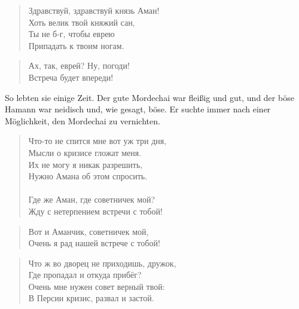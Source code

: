\documentclass[12pt,a4paper,titlepage]{article}
\begin{document}
\begin{drama}
\mspeaks {}
\begin{verse}
Здравствуй, здравствуй князь Аман!\\
Хоть велик твой княжий сан,\\
Ты не б-г, чтобы еврею\\
Припадать к твоим ногам.\\
\end{verse}


\amspeaks
\begin{verse}
Ах, так, еврей? Ну, погоди!\\
Встреча будет впереди!\\
\end{verse}


\uespeaks
So lebten sie einige Zeit. Der gute Mordechai war fleißig und gut,
und der böse Hamann war neidisch und, wie gesagt, böse. Er suchte
immer nach einer Möglichkeit, den Mordechai zu vernichten.


\scene


\ahspeaks {}
\begin{verse}
Что-то не спится мне вот уж три дня,\\
Мысли о кризисе гложат меня.\\
Их не могу я никак разрешить,\\
Нужно Амана об этом спросить.\\
\\
Где же Аман, где советничек мой?\\
Жду с нетерпением встречи с тобой!\\
\end{verse}


\ahspeaks
\begin{verse}
Вот и Аманчик, советничек мой,\\
Очень я рад нашей встрече с тобой!\\
\end{verse}


\ahspeaks {}
\begin{verse}
Что ж во дворец не приходишь, дружок,\\
Где пропадал и откуда прибёг?\\
Очень мне нужен совет верный твой:\\
В Персии кризис, развал и застой.\\
\end{verse}


\end{drama}
\end{document}
